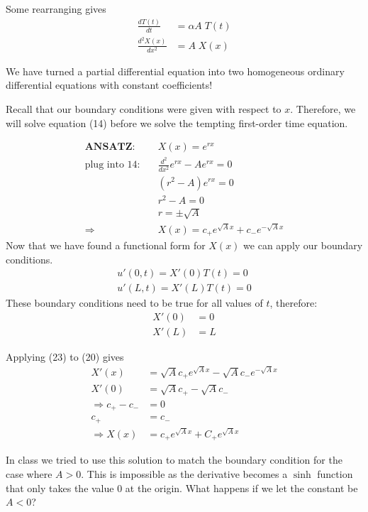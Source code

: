 \documentclass[a4paper, 11pt]{article}
\newenvironment{solution}{%
	\begin{list}{}{%
			\setlength{\topsep}{0pt}%
			\setlength{\leftmargin}{0.5cm}%
			\setlength{\rightmargin}{0.5cm}%
			\setlength{\listparindent}{\parindent}%
			\setlength{\itemindent}{\parindent}%
			\setlength{\parsep}{\parskip}%
		}%
		\item[]}{\end{list}}
\begin{document}
\begin{enumerate}[leftmargin=0em]
\begin{solution}
    Some rearranging gives
    \begin{align}
      \frac{d T(t)}{dt} &= \alpha A\; T(t) \\
      \frac{d^2 X(x)}{dx^2} &= A\;X(x)
    \end{align}
    
    We have turned a partial differential equation into two homogeneous ordinary
    differential equations with constant coefficients! 
		
		Recall that our boundary
    conditions were given with respect to $x$. Therefore, we will solve equation
    (14) before we solve the tempting first-order time equation.

    \begin{align}
      \textbf{ANSATZ:} \quad &X(x)= e^{rx} \\
      \text{plug into 14:}\quad &\frac{d^2}{dx^2}e^{rx} - Ae^{rx}= 0 \\
      &(r^2-A)e^{rx}= 0 \\
      &r^2-A= 0 \\
      &r= \pm\sqrt{A} \\
      \Rightarrow &X(x)= c_+e^{\sqrt{A}x}+c_-e^{-\sqrt{A}x}
    \end{align}
    Now that we have found a functional form for $X(x)$ we can apply our boundary
    conditions. 
    \begin{align}
      u'(0,t) = X'(0)T(t) = 0 \\
      u'(L,t) = X'(L)T(t) = 0 
    \end{align}
    These boundary conditions need to be true for all values of $t$, therefore:
    \begin{align}
      X'(0) &= 0 \\
      X'(L) &= L 
    \end{align}
    
    Applying (23) to (20) gives
    \begin{align}
      X'(x) &= \sqrt{A}c_+e^{\sqrt{A}x}-\sqrt{A}c_-e^{-\sqrt{A}x} \\
      X'(0) &= \sqrt{A}c_+-\sqrt{A}c_- \\
      \Rightarrow c_+-c_- &= 0 \\
      c_+ &= c_- \\
      \Rightarrow X(x) &= c_+e^{\sqrt{A}x}+C_+e^{\sqrt{A}x}
    \end{align}
    
    In class we tried to use this solution to match the boundary condition for
    the case where $A>0$. This is impossible as the derivative becomes a $\sinh$
    function that only takes the value 0 at the origin. What happens if we let
    the constant be $A<0$?


\end{solution}
\end{enumerate}
\end{document}
